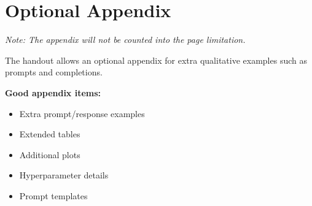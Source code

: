 \documentclass[11pt, twocolumn]{article}
\begin{document}
\clearpage
\appendix
\section{Optional Appendix}
\textit{Note: The appendix will not be counted into the page limitation.}

The handout allows an optional appendix for extra qualitative examples such as prompts and completions. 

\textbf{Good appendix items:}
\begin{itemize}
    \item Extra prompt/response examples
    \item Extended tables
    \item Additional plots
    \item Hyperparameter details
    \item Prompt templates
\end{itemize}
\end{document}
